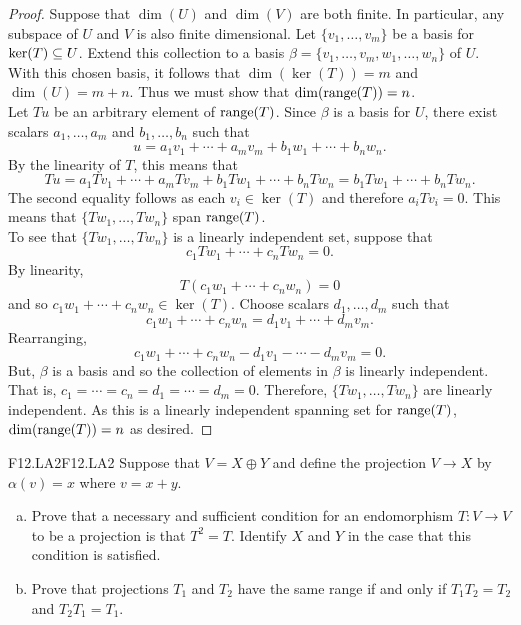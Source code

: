 \documentclass[../AlgebraQualSolutions.tex]{subfiles}
\begin{document}
	\begin{proof}
		Suppose that $\dim(U)$ and $\dim(V)$ are both finite. In particular, any subspace of $U$ and $V$ is also finite dimensional. Let $\{v_1,\ldots, v_m\}$ be a basis for $\ker(T) \subseteq U$. Extend this collection to a basis $\beta = \{v_1,\ldots, v_m, w_1,\ldots, w_n\}$ of $U$. With this chosen basis, it follows that $\dim(\ker(T)) = m$ and $\dim(U) = m + n$. Thus we must show that $\dim(\mathrm{range}(T)) = n$.\\

		Let $Tu$ be an arbitrary element of $\mathrm{range}(T)$. Since $\beta$ is a basis for $U$, there exist scalars $a_1,\ldots, a_m$ and $b_1,\ldots,b_n$ such that
			\[u = a_1v_1 + \cdots + a_mv_m + b_1w_1 + \cdots + b_nw_n. \]
		By the linearity of $T$, this means that
			\[Tu = a_1Tv_1 + \cdots + a_mTv_m + b_1Tw_1 + \cdots + b_nTw_n = b_1Tw_1 + \cdots + b_nTw_n.\]
		The second equality follows as each $v_i \in \ker(T)$ and therefore $a_iTv_i = 0$. This means that $\{Tw_1,\ldots,Tw_n\}$ span $\mathrm{range}(T)$.\\

		To see that $\{Tw_1,\ldots,Tw_n\}$ is a linearly independent set, suppose that
			\[c_1Tw_1 + \cdots + c_nTw_n = 0.\]
		By linearity,
			\[T(c_1w_1 + \cdots + c_nw_n) = 0\]
		and so $c_1w_1 + \cdots + c_nw_n \in \ker(T)$. Choose scalars $d_1,\ldots, d_m$ such that
			\[c_1w_1 + \cdots + c_nw_n = d_1v_1 + \cdots + d_mv_m.\]
		Rearranging,
			\[c_1w_1 + \cdots + c_nw_n - d_1v_1 - \cdots - d_mv_m = 0.\]
		But, $\beta$ is a basis and so the collection of elements in $\beta$ is linearly independent. That is, $c_1 = \cdots = c_n = d_1 = \cdots = d_m = 0$. Therefore, $\{Tw_1,\ldots,Tw_n\}$ are linearly independent. As this is a linearly independent spanning set for $\mathrm{range}(T)$, $\dim(\mathrm{range}(T)) = n$ as desired.
	\end{proof}

	\begin{prob}{F12.LA2}{F12.LA2}
	Suppose that $V = X \oplus Y$ and define the projection $V \to X$ by $\alpha(v) = x$ where $v = x+y$.
	\begin{enumerate}[(a)]
	\item Prove that a necessary and sufficient condition for an endomorphism $T: V \to V$ to be a projection is that $T^2 = T$. Identify $X$ and $Y$ in the case that this condition is satisfied.
	\item Prove that projections $T_1$ and $T_2$ have the same range if and only if $T_1T_2 = T_2$ and $T_2T_1 = T_1$.
	\end{enumerate}
	\end{prob}
\end{document}
